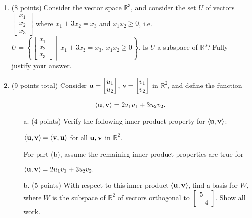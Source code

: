 \documentclass[12pt]{extarticle}
\begin{document}
\begin{enumerate}
\item (8 points) Consider the vector space $\mathbb{R}^3$, and consider the set $U$ of vectors $\begin{bmatrix} x_1\\x_2\\x_3\end{bmatrix}$ where $x_1+3x_2=x_3$ and $x_1x_2\geq 0$, i.e. $U=\left\{\begin{bmatrix} x_1 \\ x_2\\x_3\end{bmatrix}\middle|\, x_1+3x_2=x_3, \, x_1x_2\geq 0\right\}.$ Is $U$ a subspace of $\mathbb{R}^3$? Fully justify your answer.






 
\newpage

\item (9 points total)
 Consider ${\mathbf{u}}=\begin{bmatrix} u_1 \\ u_2\end{bmatrix}$, ${\mathbf{v}}=\begin{bmatrix} v_1 \\ v_2\end{bmatrix}$ in $\mathbb{R}^2$, and define the function

$$\langle {\mathbf{u}},{\mathbf{v}}\rangle =2u_1v_1+3u_2v_2.$$

\begin{itemize}
\item[a.] (4 points) Verify the following inner product property for $\langle {\mathbf{u}},{\mathbf{v}}\rangle $:

$\langle {\mathbf{u}},{\mathbf{v}}\rangle =\langle {\mathbf{v}},{\mathbf{u}}\rangle $ for all ${\mathbf{u}},{\mathbf{v}}$ in $\mathbb{R}^2$.

    \vfill
 For part (b), assume the remaining inner product properties are true for 
 
$\langle {\mathbf{u}},{\mathbf{v}}\rangle =2u_1v_1+3u_2v_2.$

\item[b.] (5 points) With respect to this inner product  $\langle {\mathbf{u}},{\mathbf{v}}\rangle$, find a basis for $W$, where $W$ is the subspace of $\mathbb{R}^2$ of vectors orthogonal to $\begin{bmatrix}5\\-4\end{bmatrix}$. Show all work.


\end{itemize}
\end{enumerate}
\end{document}
